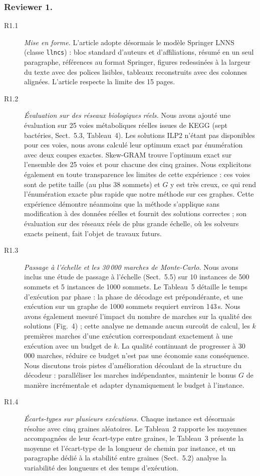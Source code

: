 \documentclass{llncs}
\begin{document}
\subsubsection{Reviewer 1.}

\begin{description}
\item[R1.1] \emph{Mise en forme.} L'article adopte désormais le modèle Springer LNNS (classe \texttt{llncs}) : bloc standard d'auteurs et d'affiliations, résumé en un seul paragraphe, références au format Springer, figures redessinées à la largeur du texte avec des polices lisibles, tableaux reconstruits avec des colonnes alignées. L'article respecte la limite des 15 pages.

\item[R1.2] \emph{Évaluation sur des réseaux biologiques réels.} Nous avons ajouté une évaluation sur 25 voies métaboliques réelles issues de KEGG (sept bactéries, Sect.~5.3, Tableau~4). Les solutions ILP2 n'étant pas disponibles pour ces voies, nous avons calculé leur optimum exact par énumération avec deux coupes exactes. Skew-GRAM trouve l'optimum exact sur l'ensemble des 25 voies et pour chacune des cinq graines. Nous explicitons également en toute transparence les limites de cette expérience : ces voies sont de petite taille (au plus 38 sommets) et $G$ y est très creux, ce qui rend l'énumération exacte plus rapide que notre méthode sur ces graphes. Cette expérience démontre néanmoins que la méthode s'applique sans modification à des données réelles et fournit des solutions correctes ; son évaluation sur des réseaux réels de plus grande échelle, où les solveurs exacts peinent, fait l'objet de travaux futurs.

\item[R1.3] \emph{Passage à l'échelle et les 30\,000 marches de Monte-Carlo.} Nous avons inclus une étude de passage à l'échelle (Sect.~5.5) sur 10 instances de 500 sommets et 5 instances de 1000 sommets. Le Tableau~5 détaille le temps d'exécution par phase : la phase de décodage est prépondérante, et une exécution sur un graphe de 1000 sommets requiert environ 143\,s. Nous avons également mesuré l'impact du nombre de marches sur la qualité des solutions (Fig.~4) ; cette analyse ne demande aucun surcoût de calcul, les $k$ premières marches d'une exécution correspondant exactement à une exécution avec un budget de $k$. La qualité continuant de progresser à 30\,000 marches, réduire ce budget n'est pas une économie sans conséquence. Nous discutons trois pistes d'amélioration découlant de la structure du décodeur : paralléliser les marches indépendantes, maintenir le bonus $G$ de manière incrémentale et adapter dynamiquement le budget à l'instance.

\item[R1.4] \emph{Écarts-types sur plusieurs exécutions.} Chaque instance est désormais résolue avec cinq graines aléatoires. Le Tableau~2 rapporte les moyennes accompagnées de leur écart-type entre graines, le Tableau~3 présente la moyenne et l'écart-type de la longueur de chemin par instance, et un paragraphe dédié à la stabilité entre graines (Sect.~5.2) analyse la variabilité des longueurs et des temps d'exécution.
\end{description}
\end{document}

